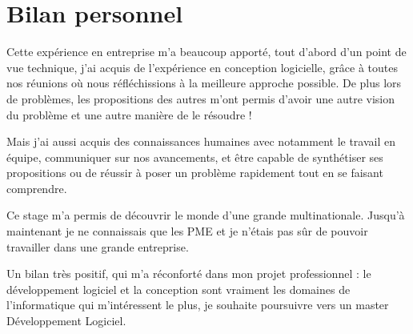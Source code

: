 	\section{Bilan personnel}
	Cette expérience en entreprise m'a beaucoup apporté, tout d'abord d'un point de vue technique, j'ai acquis de l'expérience en conception logicielle, grâce
	à toutes nos réunions où nous réfléchissions à la meilleure approche possible. De plus lors de problèmes, les propositions des autres m'ont permis d'avoir
	une autre vision du problème et une autre manière de le résoudre !

	Mais j'ai aussi acquis des connaissances humaines avec notamment le travail en équipe, communiquer sur nos avancements, et être capable de synthétiser ses
	propositions ou de réussir à poser un problème rapidement tout en se faisant comprendre.

	Ce stage m'a permis de découvrir le monde d'une grande multinationale. Jusqu'à maintenant je ne connaissais que les PME et je n'étais pas sûr de pouvoir
	travailler dans une grande entreprise.

	Un bilan très positif, qui m'a réconforté dans mon projet professionnel : le développement logiciel et la conception sont vraiment les domaines de
	l'informatique qui m'intéressent le plus, je souhaite poursuivre vers un master Développement Logiciel.
